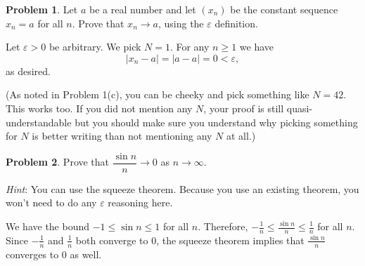\documentclass[11pt,oneside]{amsart}
\theoremstyle{definition}
\newtheorem{problem}{Problem}
\theoremstyle{plain}
\newcommand{\eps}{\varepsilon}
\begin{document}
    \begin{problem}
        Let $a$ be a real number and let $(x_n)$ be the constant sequence $x_n=a$ for all $n$. Prove that $x_n\to a$, using the $\eps$ definition.
    \end{problem}
    \begin{solution}
        Let $\eps>0$ be arbitrary. We pick $N=1$. For any $n\geq 1$ we have
        \[|x_n-a|=|a-a|=0<\eps,\]
        as desired.

        (As noted in Problem 1(c), you can be cheeky and pick something like $N=42$. This works too. If you did not mention any $N$, your proof is still quasi-understandable but you should make sure you understand why picking something for $N$ is better writing than not mentioning any $N$ at all.)
    \end{solution}

    \begin{problem}
        Prove that $\dfrac{\sin n}n\to 0$ as $n\to\infty$.
        
        \emph{Hint}: You can use the squeeze theorem. Because you use an existing theorem, you won't need to do any $\eps$ reasoning here.
    \end{problem}
    \begin{solution}
        We have the bound $-1\leq \sin n\leq 1$ for all $n$. Therefore, $-\frac 1n\leq \frac{\sin n}n\leq \frac 1n$ for all $n$. Since $-\frac 1n$ and $\frac 1n$ both converge to 0, the squeeze theorem implies that $\frac{\sin n}n$ converges to 0 as well.
    \end{solution}
\end{document}
